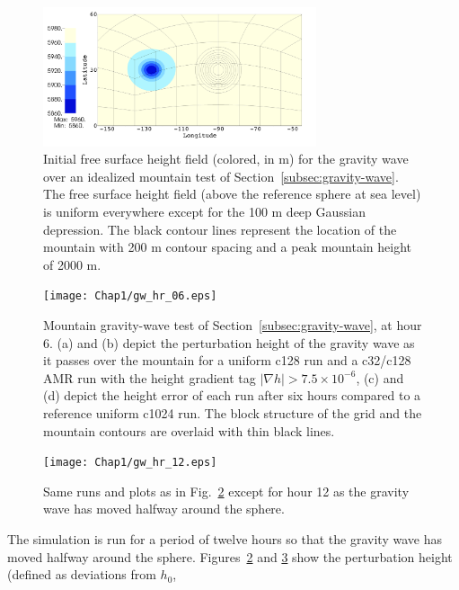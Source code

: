 \begin{figure}
    \centerline{%
    \noindent
    \includegraphics[width=19pc]{Chap1/GW_c256_hpert_flat_hr_00}}
    \caption{Initial free surface height field (colored, in m) for the gravity wave over an idealized
    mountain test of
Section~\ref{subsec:gravity-wave}.
  The free surface height field (above the reference sphere at sea level) is uniform everywhere except for
    the 100 m deep Gaussian depression.  The black contour lines
    represent the location of the mountain with 200 m contour spacing
    and a peak mountain height of 2000 m.}%
    \label{fig:gw_setup}
\end{figure}
%
\begin{figure}
    \centerline{%
    \noindent
    \texttt{[image: Chap1/gw\_hr\_06.eps]}}
    \caption{Mountain gravity-wave test of
Section~\ref{subsec:gravity-wave},
 at hour 6.  (a) and (b) depict the
    perturbation height of the gravity wave as it passes over the
    mountain for a uniform c128 run and a c32/c128 AMR run with the height gradient tag 
    $|\nabla h| > 7.5 \times 10^{-6}$,  (c) and (d)
    depict the height error of each run after six hours compared to a
    reference uniform c1024 run.  The block structure of the grid and
    the mountain contours are overlaid with thin black lines.}%
    \label{fig:GW_hr6}
\end{figure}
%
\begin{figure}
    \centerline{%
    \noindent
    \texttt{[image: Chap1/gw\_hr\_12.eps]}}
    \caption{Same runs and plots as in 
Fig.~\ref{fig:GW_hr6} except for hour 12 as the gravity wave has moved
    halfway around the sphere.}%
    \label{fig:GW_hr12}
\end{figure}
%
The simulation is run for a period of twelve hours so that the gravity
wave has moved halfway around the sphere.
Figures~\ref{fig:GW_hr6} and
\ref{fig:GW_hr12} show the perturbation height (defined as deviations from $h_0$,
